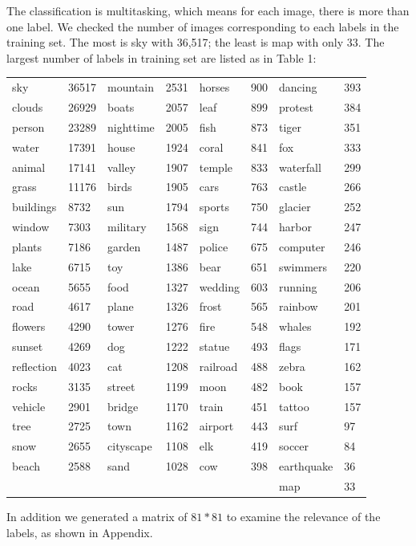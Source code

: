 \documentclass{article}
\begin{document}
The classification is multitasking, which means for each image, there is more than one label. We checked the number of images corresponding to each labels in the training set. The most is sky with 36,517; the least is map with only 33. The largest number of labels in training set are listed as in Table 1:

\begin{table}[t]
\begin{tabular}{llllllll}\hline
sky & 36517 & mountain & 2531 & horses & 900 & dancing & 393 \\
clouds & 26929 & boats & 2057 & leaf & 899 & protest & 384 \\
person & 23289 & nighttime & 2005 & fish & 873 & tiger & 351 \\
water & 17391 & house & 1924 & coral & 841 & fox & 333 \\
animal & 17141 & valley & 1907 & temple & 833 & waterfall & 299 \\
grass & 11176 & birds & 1905 & cars & 763 & castle & 266 \\
buildings & 8732 & sun & 1794 & sports & 750 & glacier & 252 \\
window & 7303 & military & 1568 & sign & 744 & harbor & 247 \\
plants & 7186 & garden & 1487 & police & 675 & computer & 246 \\
lake & 6715 & toy & 1386 & bear & 651 & swimmers & 220 \\
ocean & 5655 & food & 1327 & wedding & 603 & running & 206 \\
road & 4617 & plane & 1326 & frost & 565 & rainbow & 201 \\
flowers & 4290 & tower & 1276 & fire & 548 & whales & 192 \\
sunset & 4269 & dog & 1222 & statue & 493 & flags & 171 \\
reflection & 4023 & cat & 1208 & railroad & 488 & zebra & 162 \\
rocks & 3135 & street & 1199 & moon & 482 & book & 157 \\
vehicle & 2901 & bridge & 1170 & train & 451 & tattoo & 157 \\
tree & 2725 & town & 1162 & airport & 443 & surf & 97 \\
snow & 2655 & cityscape & 1108 & elk & 419 & soccer & 84 \\
beach & 2588 & sand & 1028 & cow & 398 & earthquake & 36 \\
 &  &  &  &  &  & map & 33 \\\hline
\end{tabular}
\end{table}
In addition we generated a matrix of $81*81$ to examine the relevance of the labels, as shown in Appendix. 
\end{document}
